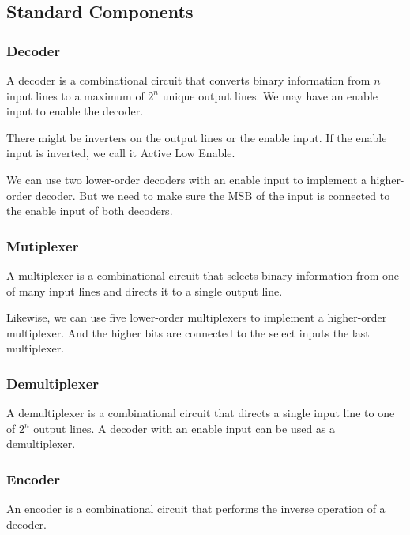 \documentclass[a4paper,12pt]{article}
\begin{document}
\subsection{Standard Components}

\subsubsection{Decoder}

A decoder is a combinational circuit that converts binary information from $n$ input lines to a maximum of $2^n$ unique output lines.
We may have an enable input to enable the decoder.

There might be inverters on the output lines or the enable input.
If the enable input is inverted, we call it Active Low Enable.

We can use two lower-order decoders with an enable input to implement a higher-order decoder.
But we need to make sure the MSB of the input is connected to the enable input of both decoders.
\subsubsection{Mutiplexer}

A multiplexer is a combinational circuit that selects binary information from one of many input lines and directs it to a single output line.

Likewise, we can use five lower-order multiplexers to implement a higher-order multiplexer.
And the higher bits are connected to the select inputs the last multiplexer.

\subsubsection{Demultiplexer}

A demultiplexer is a combinational circuit that directs a single input line to one of $2^n$ output lines.
A decoder with an enable input can be used as a demultiplexer.

\subsubsection{Encoder}

An encoder is a combinational circuit that performs the inverse operation of a decoder.
\end{document}
